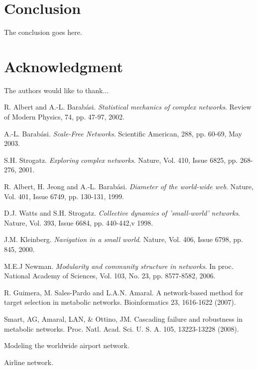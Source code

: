 \documentclass[twocolumn,showpacs,preprintnumbers,amsmath,amssymb]{revtex4}
\begin{document}
%
%


\section{Conclusion}
The conclusion goes here.

\section*{Acknowledgment}
The authors would like to thank...
\begin{thebibliography}{1}
R. Albert and A.-L. Barab\'{a}si. \textit{Statistical mechanics of complex networks}. Review of Modern Physics, 74, pp. 47-97, 2002.

A.-L. Barab\'{a}si. \textit{Scale-Free Networks}. Scientific American, 288, pp. 60-69, May 2003.

S.H. Strogatz. \textit{Exploring complex networks}. Nature, Vol. 410, Issue 6825, pp. 268-276, 2001.

R. Albert, H. Jeong and A.-L. Barab\'{a}si. \textit{Diameter of the world-wide web}. Nature, Vol. 401, Issue 6749, pp. 130-131, 1999.

D.J. Watts and S.H. Strogatz. \textit{Collective dynamics of 'small-world' networks}. Nature, Vol. 393, Issue 6684, pp. 440-442,v 1998.

J.M. Kleinberg. \textit{Navigation in a small world}. Nature, Vol. 406, Issue 6798, pp. 845, 2000.

M.E.J Newman. \textit{Modularity and community structure in networks}. In proc. National Academy of Sciences, Vol. 103, No. 23, pp. 8577-8582, 2006.

R. Guimera, M. Sales-Pardo and L.A.N. Amaral. A network-based method for target selection in metabolic networks. Bioinformatics 23, 1616-1622 (2007).

Smart, AG, Amaral, LAN, & Ottino, JM. Cascading failure and robustness in metabolic networks. Proc. Natl. Acad. Sci. U. S. A. 105, 13223-13228 (2008).

Modeling the worldwide airport network.

Airline network.

\end{thebibliography}
\end{document}
